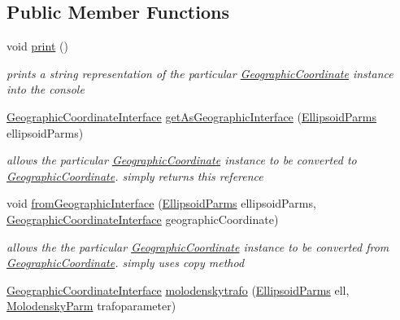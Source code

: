 \subsection*{Public Member Functions}
\begin{DoxyCompactItemize}
\item 
void \hyperlink{classcoordinates_1_1_geographic_coordinate_interface_a8d32481c2a4f1134d73cd05e2837e8d1}{print} ()
\begin{DoxyCompactList}\small\item\em prints a string representation of the particular \hyperlink{classcoordinates_1_1_geographic_coordinate}{Geographic\+Coordinate} instance into the console \end{DoxyCompactList}\item 
\hyperlink{classcoordinates_1_1_geographic_coordinate_interface}{Geographic\+Coordinate\+Interface} \hyperlink{classcoordinates_1_1_geographic_coordinate_interface_a5a7c2ad22340e5337db778034c732ac8}{get\+As\+Geographic\+Interface} (\hyperlink{classparams_1_1_ellipsoid_parms}{Ellipsoid\+Parms} ellipsoid\+Parms)
\begin{DoxyCompactList}\small\item\em allows the particular \hyperlink{classcoordinates_1_1_geographic_coordinate}{Geographic\+Coordinate} instance to be converted to \hyperlink{classcoordinates_1_1_geographic_coordinate}{Geographic\+Coordinate}. simply returns this reference \end{DoxyCompactList}\item 
void \hyperlink{classcoordinates_1_1_geographic_coordinate_interface_a46c2f155f18261c37578c41a5f40ad1c}{from\+Geographic\+Interface} (\hyperlink{classparams_1_1_ellipsoid_parms}{Ellipsoid\+Parms} ellipsoid\+Parms, \hyperlink{classcoordinates_1_1_geographic_coordinate_interface}{Geographic\+Coordinate\+Interface} geographic\+Coordinate)
\begin{DoxyCompactList}\small\item\em allows the the particular \hyperlink{classcoordinates_1_1_geographic_coordinate}{Geographic\+Coordinate} instance to be converted from \hyperlink{classcoordinates_1_1_geographic_coordinate}{Geographic\+Coordinate}. simply uses copy method \end{DoxyCompactList}\item 
\hyperlink{classcoordinates_1_1_geographic_coordinate_interface}{Geographic\+Coordinate\+Interface} \hyperlink{classcoordinates_1_1_geographic_coordinate_interface_ac9c19d2f8667c6eecb0674106cabbe63}{molodenskytrafo} (\hyperlink{classparams_1_1_ellipsoid_parms}{Ellipsoid\+Parms} ell, \hyperlink{classparams_1_1_molodensky_parm}{Molodensky\+Parm} trafoparameter)

\end{DoxyCompactItemize}
